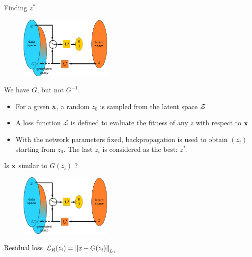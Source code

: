\documentclass[xcolor=pdftex,dvipsnames,table,mathserif]{beamer}
\begin{document}
\begin{frame}{Finding $z^*$}

  \begin{figure}[ht]
    \centering
    \includegraphics[width=0.4\textwidth]{gan2}
  \end{figure}

  We have $G$, but not $G^{-1}$.

  \begin{itemize}
  \item For a given $\mathbf{x}$, a random $z_0$ is sampled from the latent space $\cal{Z}$
  \item A loss function $\mathcal{L}$ is defined to evaluate the fitness of any $z$ with respect to $\mathbf{x}$
  \item With the network parameters fixed, backpropagation is used to obtain $(z_i)$ starting from $z_0$. The last $z_i$ is considered as the best: $z^*$.
  \end{itemize}

\end{frame}


\begin{frame}{Is $\mathbf{x}$ similar to $G(z_i)$ ?}

  \begin{figure}[ht]
    \centering
    \includegraphics[width=0.4\textwidth]{gan2}
  \end{figure}

  \begin{block}{Residual loss}
    \centering
    $\mathcal{L}_R(z_i) = \norm{x - G(z_i)}_{L_1}$
  \end{block}

\end{frame}
\end{document}
